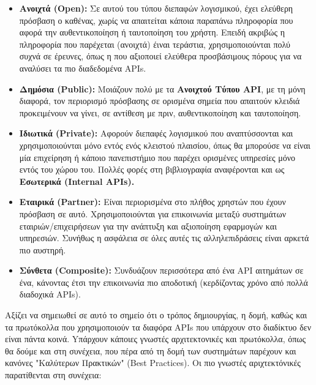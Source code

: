 \begin{itemize}
	\item \textbf{Ανοιχτά (Open):} Σε αυτού του τύπου διεπαφών λογισμικού, έχει ελεύθερη πρόσβαση ο καθένας,
		χωρίς να απαιτείται κάποια παραπάνω πληροφορία που αφορά την αυθεντικοποίηση ή ταυτοποίηση του χρήστη.
		Επειδή ακριβώς η πληροφορία που παρέχεται (ανοιχτά) έιναι τεράστια, χρησιμοποιούνται πολύ
		συχνά σε έρευνες, όπως η \cite{open_restful_api_analysis} που αξιοποιεί ελεύθερα προσβάσιμους
		πόρους για να αναλύσει τα πιο διαδεδομένα APIs. 
	\item \textbf{Δημόσια (Public):} Μοιάζουν πολύ με τα \textbf{Ανοιχτού Τύπου API}, με τη μόνη διαφορά, τον περιορισμό
		πρόσβασης σε ορισμένα σημεία που απαιτούν κλειδιά προκειμένουν να γίνει, σε αντίθεση με πριν, αυθεντικοποίηση και ταυτοποίηση. 
	\item \textbf{Ιδιωτικά (Private):} Αφορούν διεπαφές λογισμικού που αναπτύσσονται και χρησιμοποιούνται μόνο εντός ενός κλειστού
		πλαισίου, όπως θα μπορούσε να είναι μία επιχείρηση ή κάποιο πανεπιστήμιο που παρέχει ορισμένες υπηρεσίες μόνο εντός του χώρου του.
		Πολλές φορές στη βιβλιογραφία αναφέρονται και ως \textbf{Εσωτερικά (Internal APIs).}
	\item \textbf{Εταιρικά (Partner):} Είναι περιορισμένα στο πλήθος χρηστών που έχουν πρόσβαση σε αυτό. Χρησιμοποιούνται
		για επικοινωνία μεταξύ συστημάτων εταιριών/επιχειρήσεων για την ανάπτυξη και αξιοποίηση εφαρμογών και υπηρεσιών.
		Συνήθως η ασφάλεια σε όλες αυτές τις αλληλεπιδράσεις είναι αρκετά πιο αυστηρή.
	\item \textbf{Σύνθετα (Composite):} Συνδυάζουν περισσότερα από ένα API αιτημάτων σε ένα, κάνοντας έτσι 
		την επικοινωνία πιο αποδοτική (κερδίζοντας χρόνο από πολλά διαδοχικά APIs).
\end{itemize}

Αξίζει να σημειωθεί σε αυτό το σημείο ότι ο τρόπος δημιουργίας, η δομή, καθώς και τα πρωτόκολλα που χρησιμοποιούν τα διαφόρα APIs που υπάρχουν στο διαδίκτυο
δεν είναι πάντα κοινά. Yπάρχουν κάποιες γνωστές αρχιτεκτονικές και πρωτόκολλα, όπως θα δούμε και στη συνέχεια, που πέρα από τη δομή
των συστημάτων παρέχουν και κανόνες "Καλύτερων Πρακτικών" (Best Practices). Οι πιο γνωστές αριχτεκτόνικές
παρατίθενται στη συνέχεια:

